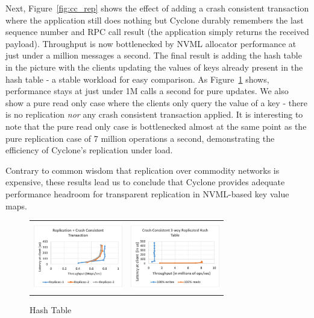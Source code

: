 \documentclass[letterpaper,twocolumn,10pt]{article}
\begin{document}
Next, Figure~\ref{fig:cc_rep} shows the effect of adding a crash consistent
transaction where the application still does nothing but Cyclone durably
remembers the last sequence number and RPC call result (the application simply
returns the received payload). Throughput is now bottlenecked by NVML allocator
performance at just under a million messages a second. The final result is
adding the hash table in the picture with the clients updating the values of
keys already present in the hash table - a stable workload for easy
comparison. As Figure~\ref{fig:app_rep} shows, performance stays at just under
1M calls a second for pure updates. We also show a pure read only case where the
clients only query the value of a key - there is no replication \emph{nor} any
crash consistent transaction applied. It is interesting to note that the pure
read only case is bottlenecked almost at the same point as the pure replication
case of 7 million operations a second, demonstrating the efficiency of Cyclone's
replication under load.

Contrary to common wisdom that replication over commodity networks is expensive,
these results lead us to conclude that Cyclone provides adequate performance
headroom for transparent replication in NVML-based key value maps.

\begin{figure}
\begin{tabular}{cc}
\begin{minipage}{0.25\textwidth}
  \hspace{-0.17in}
  \includegraphics[width=\textwidth,height=3cm]{results/cc_mops.pdf}
  \caption{Crash Consistency}
  \label{fig:cc_rep}
\end{minipage} &
  \hspace{-0.37in}
\begin{minipage}{0.25\textwidth}
  \includegraphics[width=\textwidth,height=3cm]{results/app_mops.pdf}
  \caption{Hash Table}
  \label{fig:app_rep}
\end{minipage}
\end{tabular}
\end{figure}
\end{document}
